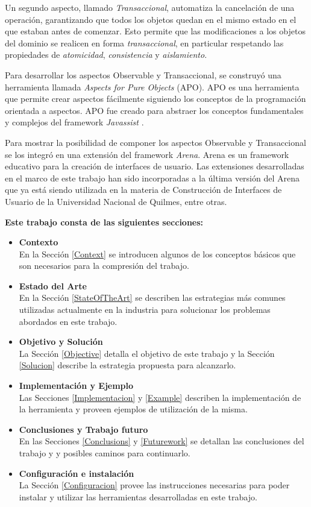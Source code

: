 Un segundo aspecto, llamado \emph{Transaccional}, automatiza la
cancelación de una operación, garantizando que todos los objetos quedan en el
mismo estado en el que estaban antes de comenzar. 
Esto permite que las modificaciones a los objetos del dominio se realicen
en forma \emph{transaccional}, en particular respetando las propiedades de
\emph{atomicidad}, \emph{consistencia} y \emph{aislamiento}.

Para desarrollar los aspectos Observable y Transaccional, se construyó una
herramienta llamada \emph{Aspects for Pure Objects} (APO).
APO es una herramienta que permite crear aspectos fácilmente siguiendo los
conceptos de la programación orientada a aspectos. APO fue creado para abstraer
los conceptos fundamentales y complejos del framework \emph{Javassist}
\cite{chiba00loadtime}.

Para mostrar la posibilidad de componer los aspectos Observable y Transaccional
se los integró en una extensión del framework \emph{Arena}.
Arena es un framework educativo para la creación de interfaces de usuario.
Las extensiones desarrolladas en el marco de este trabajo han sido incorporadas
a la última versión del Arena que ya está siendo utilizada en la materia de
Construcción de Interfaces de Usuario de la Universidad Nacional de Quilmes,
entre otras.

\bigskip

\noindent \textbf{Este trabajo consta de las siguientes secciones:}
\begin{itemize}
	\item \textbf{Contexto}\\
		En la Sección \ref{Context} se introducen algunos de los conceptos básicos que
		son necesarios para la compresión del trabajo.
	\item \textbf{Estado del Arte}\\
		En la Sección \ref{StateOfTheArt} se describen las estrategias más comunes
		utilizadas actualmente en la industria para solucionar los problemas abordados
		en este trabajo.
	\item \textbf{Objetivo y Solución}\\
		La Sección \ref{Objective} detalla el objetivo de este trabajo y la Sección
		\ref{Solucion} describe la estrategia propuesta para alcanzarlo.
	\item \textbf{Implementación y Ejemplo}\\
		Las Secciones \ref{Implementacion} y \ref{Example} describen la
		implementación de la herramienta y proveen ejemplos de utilización de la misma.
	\item \textbf{Conclusiones y Trabajo futuro}\\
		En las Secciones \ref{Conclusions} y \ref{Futurework} se detallan las
		conclusiones del trabajo y y posibles caminos para continuarlo.
	\item \textbf{Configuración e instalación}\\
		La Sección \ref{Configuracion} provee las instrucciones necesarias para poder instalar 
		y utilizar las herramientas desarrolladas en este trabajo. 
\end{itemize}

